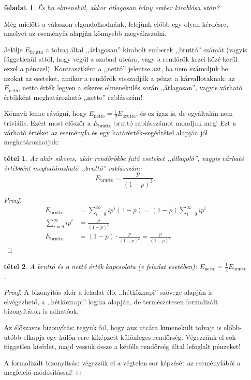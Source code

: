 \documentclass{article}
\newtheorem{task}{feladat}
\newtheorem{theorem}{tétel}
\newcommand{\parenthesed}[1]{\left(#1\right)}
\newcommand{\expvalnet}{E_{\text{netto}}}
\newcommand{\expvalgro}{E_{\text{brutto}}}
\begin{document}
	\begin{task}
		És ha elmenekül, akkor átlagosan hány ember kirablása után?
	\end{task}

	Még mielőtt a válaszon elgondolkodnánk, felejünk előbb egy olyan kérdésre, amelyet az eseményfa alapján könnyebb megválaszolni.

	Jelölje $\expvalgro$ a tolvaj által ,,átlagosan'' kirabolt emberek ,,bruttó'' számát (vagyis függetlenül attól, hogy végül a szabad utcára, vagy a rendőrök kezei közé kerül ezzel a pénzzel). 		Kontrasztként a ,,nettó'' jelentse azt, ha nem számoljuk be azokat az eseteket, amikor a rendőrök visszadják a pénzt a kárvallotaknak: az $\expvalnet$ netto érték legyen a sikeres elmenekülés során ,,átlagosan'', vagyis várható értékként meghatározható ,,netto'' rablásszám!

	Könnyű lenne rávágni, hogy $\expvalnet = \frac12\expvalgro$, és ez igaz is, de egyáltalán nem triviális. Ezért most először a $\expvalgro$ bruttó rablásszámot mondjuk meg! Ezt a  várható értéket az eseményfa és egy határérték-segédtétel alapján jól meghatározhatjuk:

	\begin{theorem}
		Az akár sikeres, akár rendőrökbe futó eseteket ,,átlagoló'', vagyis várható értékként meghatározható ,,bruttó'' rablásszám:
		\begin{equation}
			\expvalgro = \frac p{\parenthesed{1-p}^3},
		\end{equation}
	\end{theorem}
	\begin{proof}
		\begin{align}
			\expvalgro             &= \sum_{i=0}^\infty ip^i\parenthesed{1-p} = \parenthesed{1-p}\sum_{i=0}^\infty ip^i\\
			\sum_{i=0}^\infty ip^i &= \frac p{\parenthesed{1-p}^2}\\
			\expvalgro             &= \parenthesed{1-p} \cdot \frac p{\parenthesed{1-p}^2} = \frac p{\parenthesed{1-p}^3}
		\end{align}
	\end{proof}
	\begin{theorem}
		A bruttó és a nettó érték kapcsolata (e feladat esetében): $\expvalnet = \frac12\expvalgro$.
	\end{theorem}
	\begin{proof}
		A bizonyítás akár a feladat élő, ,,hétköznapi'' szövege alapján is elvégezhető, a ,,hétköznapi'' logika alapján, de természetesen formalizált bizonyítások is adhatóak.

		Az élőszavas bizonyítás: tegyük föl, hogy auz utcára kimenekült tolvajt is előbb-utóbb elkapja egy külön erre kiképzett különleges rendőrség.
		Végezzünk el sok független kísérlet, majd vessük össze a kétféle rendőrség által lefoglalt pénzeket!

		A formalizált bizonyítsás: végezzük el a végtelen sor képzését az eseményfából a megfelelő módosítással!
	\end{proof}
\end{document}
